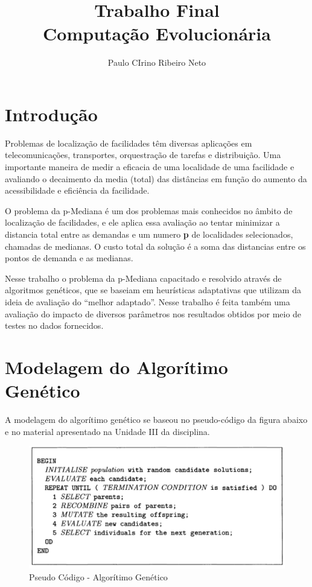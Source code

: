 \documentclass[]{article}
\title{ Trabalho Final \\ Computação Evolucionária }
\author{Paulo CIrino Ribeiro Neto}
\begin{document}
\maketitle

\section{Introdução}

Problemas de localização de facilidades têm diversas aplicações em telecomunicações, transportes, orquestração de tarefas e distribuição. Uma importante maneira de medir a eficacia de uma localidade de uma facilidade e avaliando o decaimento da media (total) das distâncias em 
função do aumento da acessibilidade e eficiência da facilidade.

O problema da p-Mediana é um dos problemas mais conhecidos no âmbito de localização de facilidades, e ele aplica essa avaliação ao tentar minimizar a distancia total entre as demandas e um numero \textbf{p} de localidades selecionados, chamadas de medianas. O custo total da solução é a soma das distancias entre os pontos de demanda e as medianas.

Nesse trabalho o problema da p-Mediana capacitado e resolvido através de algoritmos genéticos, que se baseiam em heurísticas adaptativas que utilizam da ideia de avaliação do ``melhor adaptado''. Nesse trabalho é feita também uma
avaliação do impacto de diversos parâmetros nos resultados obtidos por meio de testes no dados fornecidos.

\section{Modelagem do Algorítimo Genético}
A modelagem do algorítimo genético se baseou no pseudo-código da figura abaixo e no material apresentado na Unidade III da disciplina.

\begin{figure}[H]
	\centering
	\includegraphics[scale = 0.5]{pics/GeneticAlgorithmPseudoCode.png}
	\caption{Pseudo Código - Algorítimo Genético}
	\label{fig:GeneticAlgorithmPseudoCode}
\end{figure}
\end{document}
